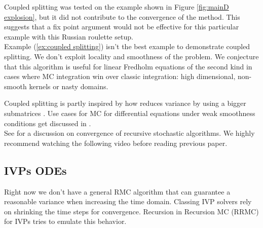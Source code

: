 \documentclass[a4paper,12pt]{article}
\begin{document}
Coupled splitting was tested on the example shown in Figure
\ref{fig:mainD explosion}, but it did not contribute to the
convergence of the method. This suggests that a fix point argument
would not be effective for this particular example with this
Russian roulette setup. \\

Example (\ref{ex:coupled splitting}) isn't the best example to demonstrate
coupled splitting. We don't exploit locality and smoothness of the problem.
We conjecture that this algorithm is useful for
linear Fredholm equations of the second kind in cases where MC integration win
over classic integration: high dimensional, non-smooth kernels or
nasty domains.

\begin{related}
    Coupled splitting is partly inspired by how \cite{sabelfeld_sparsified_2009}
    reduces variance by using a bigger submatrices .
    Use cases for MC for differential equations under weak smoothness conditions
    get discussed in \cite{jentzen_random_2009}. \\

    See \cite{gupta_convergence_2021} for a discussion on convergence
    of recursive stochastic algorithms. We highly recommend watching
    the following video \cite{abhishek_gupta_recursive_2020} before reading
    previous paper.
\end{related}


\subsection{IVPs ODEs}

Right now we don't have a general RMC algorithm that can
guarantee a reasonable variance when increasing the time domain.
Classing IVP solvers rely on shrinking the time steps for
convergence. Recursion in Recursion MC (RRMC) for IVPs tries to emulate
this behavior.
\end{document}
